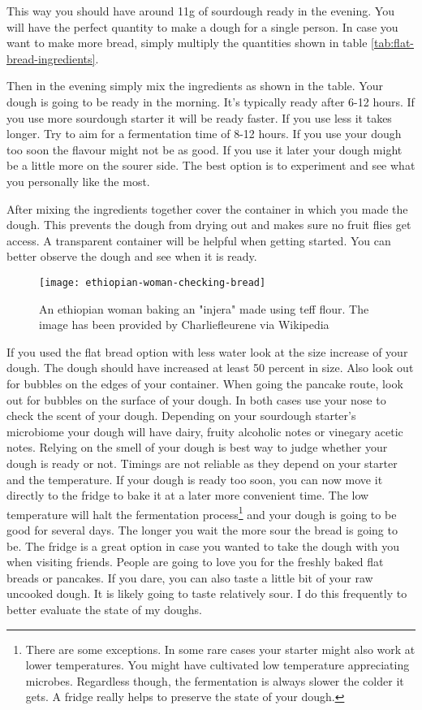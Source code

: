 This way you should have around 11g of sourdough ready in the evening. You will have
the perfect quantity to make a dough for a single person. In case you want to make more
bread, simply multiply the quantities shown in table \ref*{tab:flat-bread-ingredients}.

Then in the evening simply mix the ingredients as shown in the table. Your dough
is going to be ready in the morning. It's typically ready after 6-12 hours. If
you use more sourdough starter it will be ready faster. If you use less it takes
longer. Try to aim for a fermentation time of 8-12 hours. If you use
your dough too soon the flavour might not be as good. If you use it later
your dough might be a little more on the sourer side. The best option is to experiment
and see what you personally like the most.

After mixing the ingredients together cover the container in which
you made the dough. This prevents the dough from drying out and makes
sure no fruit flies get access. A transparent container will be helpful
when getting started. You can better observe the dough and see when
it is ready.

\begin{figure}[htb!]
  \texttt{[image: ethiopian-woman-checking-bread]}
  \centering
  \caption{An ethiopian woman baking an "injera" made using teff flour. 
  The image has been provided by Charliefleurene via Wikipedia}
\end{figure}

If you used the flat bread option with less water look at the size increase
of your dough. The dough should have increased at least 50 percent in size.
Also look out for bubbles on the edges of your container.
When going the pancake route, look out for bubbles on the surface of your dough.
In both cases use your nose to check the scent of your dough. Depending
on your sourdough starter's microbiome your dough will have 
dairy, fruity alcoholic notes or vinegary acetic notes. Relying
on the smell of your dough is best way to judge whether your
dough is ready or not. Timings are not reliable as they
depend on your starter and the temperature. If your dough
is ready too soon, you can now move it directly to the fridge to bake
it at a later more convenient time. The low temperature will halt the fermentation
process\footnote{There are some exceptions. In some rare cases your starter
might also work at lower temperatures. You might have cultivated low temperature appreciating
microbes. Regardless though, the fermentation
is always slower the colder it gets. A fridge really helps to preserve the state
of your dough.}
and your dough is going to be good for several days. The longer you wait the more sour the
bread is going to be. The fridge is a great option in case you wanted to
take the dough with you when visiting friends. People are going
to love you for the freshly baked flat breads or pancakes. If you dare,
you can also taste a little bit of your raw uncooked dough. It is likely
going to taste relatively sour. I do this frequently to better evaluate the
state of my doughs.


